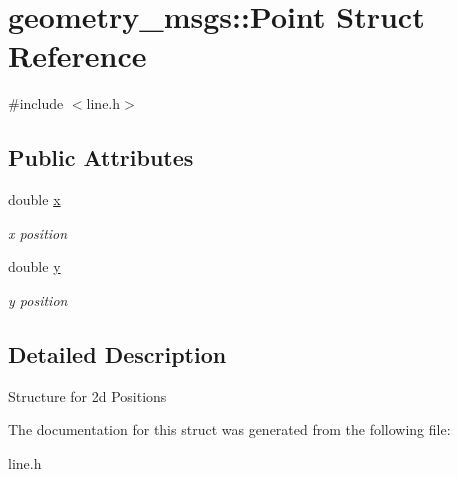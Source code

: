 \hypertarget{structgeometry__msgs_1_1Point}{}\section{geometry\+\_\+msgs\+:\+:Point Struct Reference}
\label{structgeometry__msgs_1_1Point}


{\ttfamily \#include $<$line.\+h$>$}

\subsection*{Public Attributes}
\begin{DoxyCompactItemize}
\item 
\mbox{\label{structgeometry__msgs_1_1Point_a52ccd2ddf703b661ed049c2a41e1525f}} 
double \hyperlink{structgeometry__msgs_1_1Point_a52ccd2ddf703b661ed049c2a41e1525f}{x}
\begin{DoxyCompactList}\small\item\em x position \end{DoxyCompactList}\item 
\mbox{\label{structgeometry__msgs_1_1Point_a8b028e43156db47fed28583d9b196d89}} 
double \hyperlink{structgeometry__msgs_1_1Point_a8b028e43156db47fed28583d9b196d89}{y}
\begin{DoxyCompactList}\small\item\em y position \end{DoxyCompactList}\end{DoxyCompactItemize}


\subsection{Detailed Description}
Structure for 2d Positions 

The documentation for this struct was generated from the following file\+:\begin{DoxyCompactItemize}
\item 
line.\+h\end{DoxyCompactItemize}

